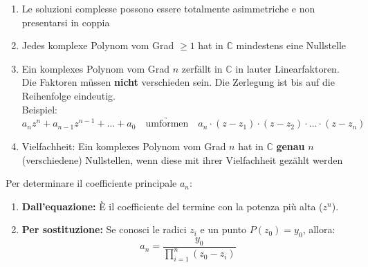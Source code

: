 
\smallskip

\begin{enumerate}[itemsep=0.2cm]
    \item Le soluzioni complesse possono essere totalmente asimmetriche e non presentarsi in coppia
    \item Jedes komplexe Polynom vom Grad $\geq 1$ hat in $\mathbb{C}$ mindestens eine Nullstelle
    \item Ein komplexes Polynom vom Grad $n$ zerfällt in $\mathbb{C}$ in lauter Linearfaktoren. \\
        Die Faktoren müssen \textbf{nicht} verschieden sein.
        Die Zerlegung ist bis auf die Reihenfolge eindeutig. \\
        Beispiel: $a_n z^n + a_{n-1}z^{n-1} + \ldots + a_0 \quad \underrightarrow{\text{umformen}} \quad a_n \cdot (z - z_1) \cdot (z - z_2) \cdot \ldots \cdot (z - z_n)$
    \item Vielfachheit: Ein komplexes Polynom vom Grad $n$ hat in $\mathbb{C}$ \textbf{genau} $n$ (verschiedene) Nullstellen, wenn diese mit ihrer 
        Vielfachheit gezählt werden
\end{enumerate}

\medskip


Per determinare il coefficiente principale \textbf{$a_n$}:
\begin{enumerate}
    \item \textbf{Dall'equazione:} È il coefficiente del termine con la potenza più alta ($z^n$).
    \item \textbf{Per sostituzione:} Se conosci le radici $z_i$ e un punto $P(z_0) = y_0$, allora:
    \[ a_n = \frac{y_0}{\prod_{i=1}^{n} (z_0 - z_i)} \]
\end{enumerate}


\smallskip

